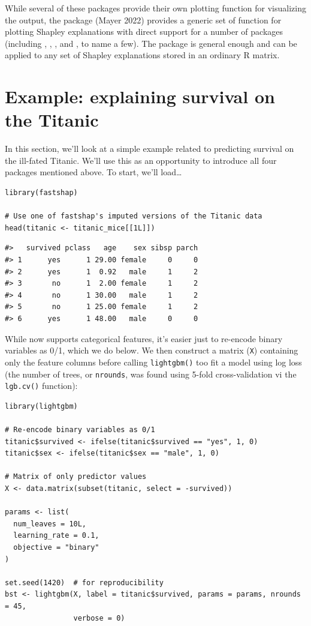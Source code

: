 While several of these packages provide their own plotting function for visualizing the output, the  package (Mayer 2022) provides a generic set of function for plotting Shapley explanations with direct support for a number of packages (including , , , and , to name a few). The package is general enough and can be applied to any set of Shapley explanations stored in an ordinary R matrix.

\hypertarget{example-explaining-survival-on-the-titanic}{%
\section{Example: explaining survival on the Titanic}\label{example-explaining-survival-on-the-titanic}}

In this section, we'll look at a simple example related to predicting survival on the ill-fated Titanic. We'll use this as an opportunity to introduce all four packages mentioned above. To start, we'll load\ldots{}

\begin{verbatim}
library(fastshap)

# Use one of fastshap's imputed versions of the Titanic data
head(titanic <- titanic_mice[[1L]])
\end{verbatim}

\begin{verbatim}
#>   survived pclass   age    sex sibsp parch
#> 1      yes      1 29.00 female     0     0
#> 2      yes      1  0.92   male     1     2
#> 3       no      1  2.00 female     1     2
#> 4       no      1 30.00   male     1     2
#> 5       no      1 25.00 female     1     2
#> 6      yes      1 48.00   male     0     0
\end{verbatim}

While  now supports categorical features, it's easier just to re-encode binary variables as 0/1, which we do below. We then construct a matrix (\texttt{X}) containing only the feature columns before calling \texttt{lightgbm()} too fit a model using log loss (the number of trees, or \texttt{nrounds}, was found using 5-fold cross-validation vi the \texttt{lgb.cv()} function):

\begin{verbatim}
library(lightgbm)

# Re-encode binary variables as 0/1
titanic$survived <- ifelse(titanic$survived == "yes", 1, 0)
titanic$sex <- ifelse(titanic$sex == "male", 1, 0)
    
# Matrix of only predictor values
X <- data.matrix(subset(titanic, select = -survived))

params <- list(
  num_leaves = 10L,
  learning_rate = 0.1,
  objective = "binary"
)

set.seed(1420)  # for reproducibility
bst <- lightgbm(X, label = titanic$survived, params = params, nrounds = 45,
                verbose = 0)
\end{verbatim}

